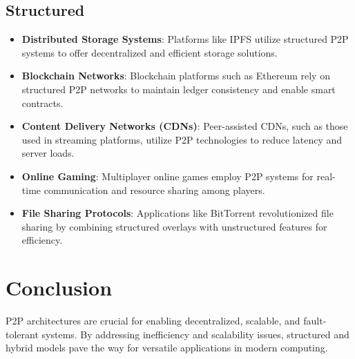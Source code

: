 \documentclass[10pt]{article}
\begin{document}
\subsection{Structured}
\begin{itemize}
    \item \textbf{Distributed Storage Systems}: Platforms like IPFS utilize structured P2P systems to offer decentralized and efficient storage solutions.
    \item \textbf{Blockchain Networks}: Blockchain platforms such as Ethereum rely on structured P2P networks to maintain ledger consistency and enable smart contracts.
    \item \textbf{Content Delivery Networks (CDNs)}: Peer-assisted CDNs, such as those used in streaming platforms, utilize P2P technologies to reduce latency and server loads.
    \item \textbf{Online Gaming}: Multiplayer online games employ P2P systems for real-time communication and resource sharing among players.
    \item \textbf{File Sharing Protocols}: Applications like BitTorrent revolutionized file sharing by combining structured overlays with unstructured features for efficiency.
\end{itemize}

\section{Conclusion}
P2P architectures are crucial for enabling decentralized, scalable, and fault-tolerant systems. By addressing inefficiency and scalability issues, structured and hybrid models pave the way for versatile applications in modern computing.
\end{document}
